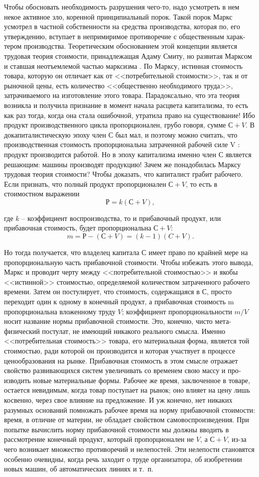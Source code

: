 \documentclass{book}
\begin{document}
Чтобы обосновать необходимость разрушения чего-то, надо усмотреть в нем некое активное зло, коренной принципиаль­ный порок. Такой порок Маркс усмотрел в частной собствен­ности на средства производства, которая по, его утверждению, вступает в непримиримое противоречие с общественным харак­тером производства. Теоретическим обоснованием этой кон­цепции является трудовая теория стоимости, принадлежащая Адаму Смиту, но развитая Марксом и ставшая неотъемлемой частью марксизма . По Марксу, истинная стоимость товара, которую он отличает как от <<потребительной стоимости>>, так и от рыночной цены, есть количество <<общественно необходи­мого труда>>, затрачиваемого на изготовление этого товара. Парадоксально, что эта теория возникла и получила призна­ние в момент начала расцвета капитализма, то есть как раз тогда, когда она стала ошибочной, утратила право на сущест­вование! Ибо продукт производственного цикла пропорционален, грубо говоря, сумме $С + V$. В докапиталистическую эпоху член $С$ был мал, и поэтому можно считать,
 что произ­водственная стоимость пропорциональна затраченной рабочей силе V : продукт производится работой. Но в эпоху капитализ­ма именно член $С$ является решающим: машины производят продукцию! Зачем же понадобилась Марксу трудовая теория стоимости? Чтобы доказать, что капиталист грабит  рабочего. Если признать, что полный продукт пропорционален $С + V$, то есть в стоимостном выражении
\[
	Р = k(С + V),
\]

где $k$ -- коэффициент воспроизводства, то и прибавочный продукт, или прибавочная стоимость, будет пропорциональ­на $С + V$:
\[
	m=Р-(С+V)=(k-1)(C+V).
\]

Но тогда получается, что владелец капитала С имеет право по крайней мере на пропорциональную часть прибавочной стои­мости. Чтобы избежать этого вывода, Маркс и проводит черту между <<потребительной стоимостью>> и якобы <<истинной>> стоимостью, определяемой количеством затраченного рабочего времени. Затем он постулирует, что стоимость, содержащаяся в $С$, просто переходит один к одному в конечный продукт, а прибавочная стоимость m  пропорциональна вложенному труду $V$; коэффициент пропорциональности $m/V$ носит назва­ние нормы прибавочной стоимости. Это, конечно, чисто мета­физический постулат, не имеющий никакого реального смысла. Именно <<потребительная стоимость>> товара, его материальная форма, является той стоимостью, ради которой он производит­ся и которая участвует в процессе ценообразования на рынке. Прибавочная стоимость в этом смысле отражает свойство раз­вивающихся систем увеличивать со временем свою массу и про­изводить новые материальные формы. Рабочее же время, заклю­ченное в товаре, остается 
невидимым, когда товар поступает на рынок; оно влияет на цену лишь косвенно, через свое влия­ние на предложение. И уж конечно, нет никаких разумных ос­нований помножать рабочее время на норму прибавочной сто­имости: время, в отличие от материи, не обладает свойством самовоспроизведения. При попытке вычислить норму приба­вочной стоимости мы должны вводить в рассмотрение конечный продукт, который пропорционален не $V$, а $С + V$, из-за чего возникает множество противоречий и нелепостей. Эти не­лепости становятся особенно очевидны, когда речь заходит о труде организатора, об изобретении новых машин, об автоматических линиях и т.~п.
\end{document}
